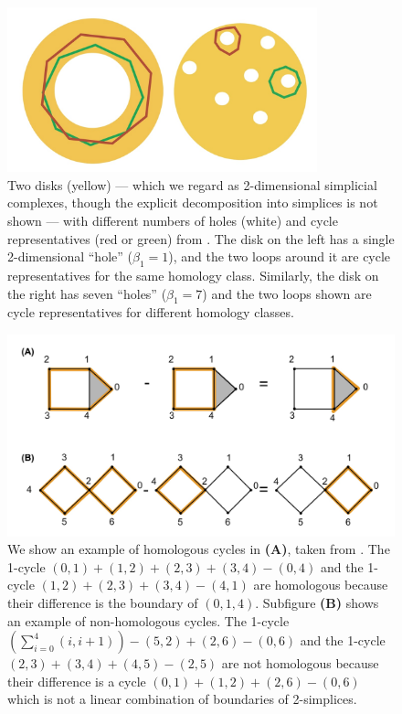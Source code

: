 \documentclass[utf8]{formatting_stuff/frontiersFPHY}
\theoremstyle{plain}
\theoremstyle{definition}
\begin{document}
\begin{figure}[!h]
    \centering
    \includegraphics[width=0.8\textwidth]{figures/generatorExample.jpg}
    \caption{Two disks (yellow) --- which we regard as 2-dimensional simplicial complexes, though the explicit decomposition into simplices is not shown --- with different numbers of holes (white) and cycle representatives (red or green) from \cite{Carlsson2009TopologyAD}. The disk on the left has a single 2-dimensional  ``hole'' ($\beta_1 = 1$), and the two loops around it are cycle representatives for the same homology class. Similarly, the disk on the right has seven ``holes'' ($\beta_1 = 7$) and the two loops shown are cycle representatives for different homology classes.
    }
    \label{fig:generatorExamples}
\end{figure}

 \begin{figure}[h!]
\begin{center}
\includegraphics[width=1\textwidth]{figures/examplesorange.jpg} 
\end{center}
\caption{We show an example of homologous cycles in \textbf{(A)}, taken from \cite{TZH15}. The 1-cycle $(0,1) + (1,2) + (2,3) + (3,4) - (0,4)$ and the 1-cycle $(1,2) + (2,3) + (3,4) - (4,1)$ are homologous because their difference is the boundary of $(0,1,4)$. Subfigure \textbf{(B)} shows an example of non-homologous cycles. The 1-cycle $(\sum_{i=0}^4 (i, i+1))-(5,2)+(2,6)-(0,6)$ and the 1-cycle $(2,3) + (3,4)+(4,5)-(2,5)$ are not homologous because their difference is a cycle $(0,1)+(1,2)+(2,6)-(0,6)$ which is not a linear combination of boundaries of 2-simplices. } \label{fig:boundaryexample}
\end{figure}
\end{document}
